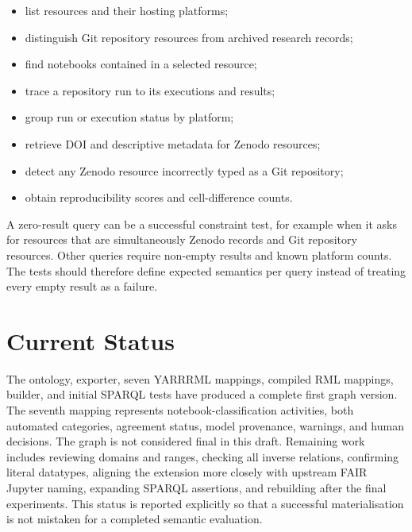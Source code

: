 \begin{itemize}
  \item list resources and their hosting platforms;
  \item distinguish Git repository resources from archived research records;
  \item find notebooks contained in a selected resource;
  \item trace a repository run to its executions and results;
  \item group run or execution status by platform;
  \item retrieve DOI and descriptive metadata for Zenodo resources;
  \item detect any Zenodo resource incorrectly typed as a Git repository;
  \item obtain reproducibility scores and cell-difference counts.
\end{itemize}

A zero-result query can be a successful constraint test, for example when it asks for resources that are simultaneously Zenodo records and Git repository resources. Other queries require non-empty results and known platform counts. The tests should therefore define expected semantics per query instead of treating every empty result as a failure.

\section{Current Status}

The ontology, exporter, seven YARRRML mappings, compiled RML mappings, builder, and initial SPARQL tests have produced a complete first graph version. The seventh mapping represents notebook-classification activities, both automated categories, agreement status, model provenance, warnings, and human decisions. The graph is not considered final in this draft. Remaining work includes reviewing domains and ranges, checking all inverse relations, confirming literal datatypes, aligning the extension more closely with upstream FAIR Jupyter naming, expanding SPARQL assertions, and rebuilding after the final experiments. This status is reported explicitly so that a successful materialisation is not mistaken for a completed semantic evaluation.
